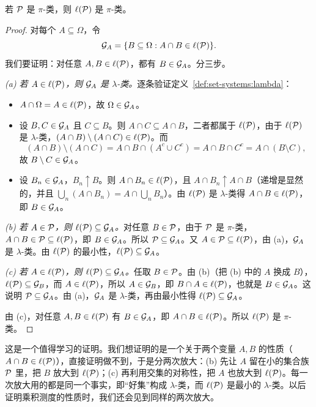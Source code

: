 \begin{lemma}[第二步]\label{lem:set-systems:ell-is-pi}
若 $\mathcal{P}$ 是 $\pi$-类，则 $\ell(\mathcal{P})$ 是 $\pi$-类。
\end{lemma}
\begin{proof}
对每个 $A\subseteq\Omega$，令
\[
\mathcal{G}_A=\{B\subseteq\Omega: A\cap B\in\ell(\mathcal{P})\}.
\]
我们要证明：对任意 $A,B\in\ell(\mathcal{P})$，都有 $B\in\mathcal{G}_A$。分三步。

\emph{(a) 若 $A\in\ell(\mathcal{P})$，则 $\mathcal{G}_A$ 是 $\lambda$-类。}逐条验证定义~\ref{def:set-systems:lambda}：
\begin{itemize}
\item $A\cap\Omega=A\in\ell(\mathcal{P})$，故 $\Omega\in\mathcal{G}_A$。
\item 设 $B,C\in\mathcal{G}_A$ 且 $C\subseteq B$。则 $A\cap C\subseteq A\cap B$，二者都属于 $\ell(\mathcal{P})$，由于 $\ell(\mathcal{P})$ 是 $\lambda$-类，$(A\cap B)\setminus(A\cap C)\in\ell(\mathcal{P})$。而
\[
(A\cap B)\setminus(A\cap C)=A\cap B\cap(A^c\cup C^c)=A\cap B\cap C^c=A\cap(B\setminus C),
\]
故 $B\setminus C\in\mathcal{G}_A$。
\item 设 $B_n\in\mathcal{G}_A$，$B_n\uparrow B$。则 $A\cap B_n\in\ell(\mathcal{P})$，且 $A\cap B_n\uparrow A\cap B$（递增是显然的，并且 $\bigcup_n(A\cap B_n)=A\cap\bigcup_nB_n$）。由 $\ell(\mathcal{P})$ 是 $\lambda$-类得 $A\cap B\in\ell(\mathcal{P})$，即 $B\in\mathcal{G}_A$。
\end{itemize}

\emph{(b) 若 $A\in\mathcal{P}$，则 $\ell(\mathcal{P})\subseteq\mathcal{G}_A$。}对任意 $B\in\mathcal{P}$，由于 $\mathcal{P}$ 是 $\pi$-类，$A\cap B\in\mathcal{P}\subseteq\ell(\mathcal{P})$，即 $B\in\mathcal{G}_A$。所以 $\mathcal{P}\subseteq\mathcal{G}_A$。又 $A\in\mathcal{P}\subseteq\ell(\mathcal{P})$，由 (a)，$\mathcal{G}_A$ 是 $\lambda$-类。由 $\ell(\mathcal{P})$ 的最小性，$\ell(\mathcal{P})\subseteq\mathcal{G}_A$。

\emph{(c) 若 $A\in\ell(\mathcal{P})$，则 $\ell(\mathcal{P})\subseteq\mathcal{G}_A$。}任取 $B\in\mathcal{P}$。由 (b)（把 (b) 中的 $A$ 换成 $B$），$\ell(\mathcal{P})\subseteq\mathcal{G}_B$，而 $A\in\ell(\mathcal{P})$，所以 $A\in\mathcal{G}_B$，即 $B\cap A\in\ell(\mathcal{P})$，也就是 $B\in\mathcal{G}_A$。这说明 $\mathcal{P}\subseteq\mathcal{G}_A$。由 (a)，$\mathcal{G}_A$ 是 $\lambda$-类，再由最小性得 $\ell(\mathcal{P})\subseteq\mathcal{G}_A$。

由 (c)，对任意 $A,B\in\ell(\mathcal{P})$ 有 $B\in\mathcal{G}_A$，即 $A\cap B\in\ell(\mathcal{P})$。所以 $\ell(\mathcal{P})$ 是 $\pi$-类。
\end{proof}

这是一个值得学习的证明。我们想证明的是一个关于两个变量 $A,B$ 的性质（$A\cap B\in\ell(\mathcal{P})$），直接证明做不到，于是分两次放大：(b) 先让 $A$ 留在小的集合族 $\mathcal{P}$ 里，把 $B$ 放大到 $\ell(\mathcal{P})$；(c) 再利用交集的对称性，把 $A$ 也放大到 $\ell(\mathcal{P})$。每一次放大用的都是同一个事实，即“好集”构成 $\lambda$-类，而 $\ell(\mathcal{P})$ 是最小的 $\lambda$-类。以后证明乘积测度的性质时，我们还会见到同样的两次放大。

